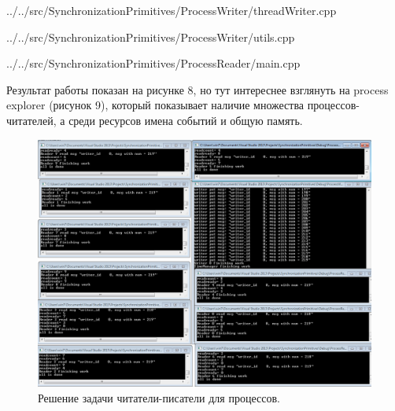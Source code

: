\documentclass[a4paper, 12pt]{article}		%
\begin{document}

{../../src/SynchronizationPrimitives/ProcessWriter/threadWriter.cpp}
\newpage


{../../src/SynchronizationPrimitives/ProcessWriter/utils.cpp}


{../../src/SynchronizationPrimitives/ProcessReader/main.cpp}

Результат работы показан на рисунке 8, но тут интереснее взглянуть на process explorer (рисунок 9), который показывает наличие множества процессов-читателей, а среди ресурсов имена событий и общую память.

\begin{figure}[h!]
\centering
\includegraphics[scale=0.45]{res/007}
\caption{Решение задачи читатели-писатели для процессов.}
\end{figure}
\end{document}
